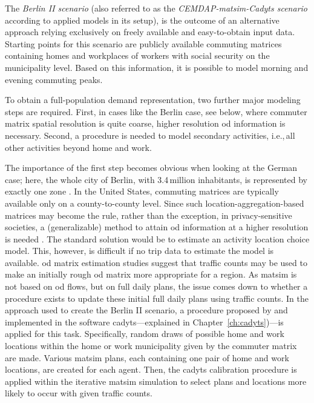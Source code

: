 The \textit{Berlin II scenario} (also referred to as the \emph{CEMDAP-\gls{matsim}-Cadyts scenario} according to applied models in its setup), is the outcome of an alternative approach relying exclusively on freely available and easy-to-obtain input data. Starting points for this scenario are publicly available commuting matrices containing homes and workplaces of workers with social security on the municipality level. Based on this information, it is possible to model morning and evening commuting peaks.

To obtain a full-population demand representation, two further major modeling steps are required. First, in cases like the Berlin case, see below, where commuter matrix spatial resolution is quite coarse, higher resolution \gls{od} information is necessary. Second, a procedure is needed to model secondary activities, i.e.,\,all other activities beyond home and work.

The importance of the first step becomes obvious when looking at the German case; here, the whole city of Berlin, with 3.4\,million inhabitants, is represented by exactly one zone \citep{BA2010Pendlerstatistik}. In the United States, commuting matrices are typically available only on a county-to-county level. Since such location-aggregation-based matrices may become the rule, rather than the exception, in privacy-sensitive societies, a (generalizable) method to attain \gls{od} information at a higher resolution is needed \citep{ZiemkeNagelBhat2015IntegratingCemdapMatsimTransferabilityTRB}. The standard solution would be to estimate an activity location choice model. This, however, is difficult if no trip data to estimate the model is available. \gls{od} matrix estimation studies \citep{ZuylenWillumsenMatrix-from-cnts} suggest that traffic counts may be used to make an initially rough \gls{od} matrix more appropriate for a region. As \gls{matsim} is not based on \gls{od} flows, but on full daily plans, the issue comes down to whether a procedure exists to update these initial full daily plans using traffic counts. In the approach used to create the Berlin II scenario, a procedure proposed by \citet{FloetteroedBierlaireNagel2010Bayesian} and implemented in the software \gls{cadyts}---explained in Chapter~\ref{ch:cadyts})---is applied for this task. Specifically, random draws of possible home and work locations within the home or work municipality given by the commuter matrix are made. Various \gls{matsim} plans, each containing one pair of home and work locations, are created for each agent. Then, the \gls{cadyts} calibration procedure is applied within the iterative \gls{matsim} simulation to select plans and locations more likely to occur with given traffic counts.

